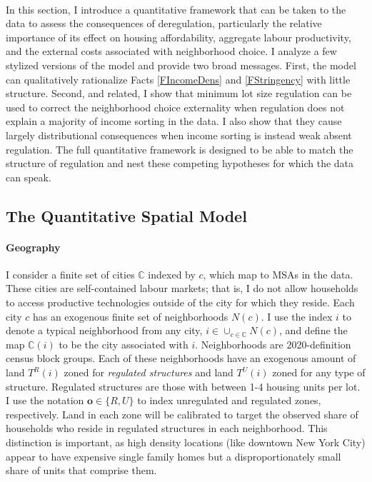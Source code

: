 \documentclass[12pt]{article}
\begin{document}
	\paragraph*{}
	In this section, I introduce a quantitative framework that can be taken to the data to assess the consequences of deregulation, particularly the relative importance of its effect on housing affordability, aggregate labour productivity, and the external costs associated with neighborhood choice. I analyze a few stylized versions of the model and provide two broad messages. First, the model can qualitatively rationalize Facts \ref{FIncomeDens} and \ref{FStringency} with little structure. Second, and related, I show that minimum lot size regulation can be used to correct the neighborhood choice externality when regulation does not explain a majority of income sorting in the data. I also show that they cause largely distributional consequences when income sorting is instead weak absent regulation. The full quantitative framework is designed to be able to match the structure of regulation and nest these competing hypotheses for which the data can speak. 
	
	\subsection{The Quantitative Spatial Model}
	
	\paragraph*{Geography}
	I consider a finite set of cities $\mathbb{C}$ indexed by $c$, which map to MSAs in the data. These cities are self-contained labour markets; that is, I do not allow households to access productive technologies outside of the city for which they reside. Each city $c$ has an exogenous finite set of neighborhoods $N(c)$. I use the index $i$ to denote a typical neighborhood from any city, $i \in \cup_{c \in \mathbb{C}}N(c)$, and define the map $\mathbb{C}(i)$ to be the city associated with $i$. Neighborhoods are 2020-definition census block groups. Each of these neighborhoods have an exogenous amount of land $T^{R}(i)$ zoned for \textit{regulated structures} and land $T^{U}(i)$ zoned for any type of structure. Regulated structures are those with between 1-4 housing units per lot. I use the notation $\boldsymbol{o} \in \{R, U\}$ to index unregulated and regulated zones, respectively. Land in each zone will be calibrated to target the observed share of households who reside in regulated structures in each neighborhood. This distinction is important, as high density locations (like downtown New York City) appear to have expensive single family homes but a disproportionately small share of units that comprise them.
\end{document}
